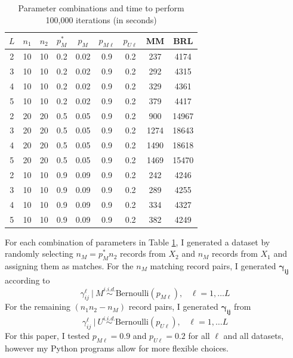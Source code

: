 \documentclass[11pt,reqno]{amsart}
\newcommand\gamij{\mathbf{\gamma_{ij}}}
\begin{document}
\begin{table}[h!]
\caption{Parameter combinations and time to perform 100,000 iterations (in seconds)}
\begin{center}
\begin{tabular}{ccccccc|cc}
\toprule
 $L$ &  $n_1$ &  $n_2$ &  $p_M^*$ &  $p_M$ & $p_{M\ell}$ &  $p_{U\ell}$ & MM & BRL \\
\midrule
 2 &  10 &  10 &  0.2 & 0.02 &  0.9 &  0.2 & 237 & 4174 \\
 3 &  10 &  10 &  0.2 & 0.02 & 0.9 &  0.2 & 292 & 4315 \\
 4 &  10 &  10 &  0.2 & 0.02 & 0.9 &  0.2 & 329 & 4361 \\ 
 5 &  10 &  10 &  0.2 & 0.02 & 0.9 &  0.2 & 379 & 4417 \\ 
 2 &  20 &  20 &  0.5 & 0.05 & 0.9 &  0.2 &  900 & 14967 \\ 
 3 &  20 &  20 &  0.5 & 0.05 & 0.9 &  0.2 & 1274 & 18643 \\ 
 4 &  20 &  20 &  0.5 & 0.05 & 0.9 &  0.2 & 1490 & 18618\\
 5 &  20 &  20 &  0.5 & 0.05 & 0.9 &  0.2 & 1469 & 15470 \\
 2 &  10 &  10 &  0.9 & 0.09 & 0.9 &  0.2 &  242 & 4246 \\
 3 &  10 &  10 &  0.9 & 0.09 & 0.9 &  0.2 & 289 & 4255 \\
 4 &  10 &  10 &  0.9 & 0.09 & 0.9 &  0.2 & 334 & 4327 \\
 5 &  10 &  10 &  0.9 & 0.09 & 0.9 &  0.2 & 382 & 4249 \\
\bottomrule
\end{tabular}
\end{center}
\label{params}
\end{table}
For each combination of parameters in Table \ref{params}, I generated a dataset by randomly selecting $n_M = p_M^* n_2$ records from $X_2$ and $n_M$ records from $X_1$ and assigning them as matches.  For the $n_M$ matching record pairs, I generated $\gamij$ according to
 $$\gamma_{ij}^{\ell} \ | \ M \overset{i.i.d.}{\sim}\text{Bernoulli}(p_{M\ell}), \hspace{10pt}\ell = 1,\dots L$$ 
For the remaining $(n_1n_2 - n_M)$ record pairs, I generated $\gamij$ from
  $$\gamma_{ij}^{\ell} \ | \ U \overset{i.i.d.}{\sim}\text{Bernoulli}(p_{U\ell}), \hspace{10pt}\ell = 1,\dots L$$ 
For this paper, I tested $p_{M\ell} = 0.9$ and $p_{U\ell}=0.2$ for all $\ell$ and all datasets, however my Python programs allow for more flexible choices.  
\end{document}

